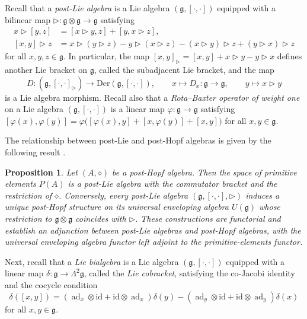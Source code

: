 \documentclass[11pt,english]{article}
\newcommand{\g}{\mathfrak{g}}
\newcommand{\id}{\mathrm{id}}
\newcommand{\act}{\mathbin{\diamond}}
\newcommand{\tri}{\mathbin{\triangleright}}
\newtheorem{proposition}[lemma]{Proposition}
\theoremstyle{definition}
\begin{document}
Recall that a \emph{post-Lie algebra} is a Lie algebra
$(\mathfrak g,[\cdot,\cdot])$ equipped with a bilinear
map $\tri:\mathfrak g\otimes\mathfrak g
\to\mathfrak g$ satisfying
\begin{align}
x\tri[y,z]
&=[x\tri y,z]+[y,x\tri z],
\label{eq:postlie-1}\\
[x,y]\tri z
&=x\tri(y\tri z)-y\tri(x\tri z)
-(x\tri y)\tri z+(y\tri x)\tri z
\label{eq:postlie-2}
\end{align}
for all $x,y,z\in\mathfrak g$.
In particular, the map $[x,y]_{\tri}=[x,y]+x\tri y-y\tri x$
defines another Lie bracket on $\mathfrak g$, called the subadjacent Lie bracket, and the map 
\begin{equation}
\label{eq:derivations}
D: (\mathfrak{g},[\cdot,\cdot]_{\tri}) \to \mathrm{Der}(\mathfrak{g},[\cdot,\cdot]), \qquad x \mapsto D_x: \g \to \g, \qquad y \mapsto x \tri y
\end{equation}
is a Lie algebra morphism.
Recall also that a \emph{Rota--Baxter operator of weight one}
on a Lie algebra $(\mathfrak g,[\cdot,\cdot])$ is a
linear map $\varphi:\mathfrak g\to\mathfrak g$ satisfying $[\varphi(x),\varphi(y)]
=\varphi\bigl(
[\varphi(x),y]+[x,\varphi(y)]+[x,y]
\bigr)$
for all $x,y\in\mathfrak g$.

The relationship between post-Lie and post-Hopf
algebras is given by the following result
\cite{LST,RSW}.

\begin{proposition}\label{prop:postlie-posthopf}
Let $(A,\act)$ be a post-Hopf algebra.
Then the space of primitive elements $P(A)$ is a post-Lie algebra with
the commutator bracket and the restriction
of $\act$.
Conversely, every post-Lie algebra
$(\mathfrak g,[\cdot,\cdot],\tri)$ induces a
unique post-Hopf structure on its universal
enveloping algebra $U(\mathfrak g)$
whose restriction to
$\mathfrak g\otimes\mathfrak g$
coincides with $\tri$. These constructions are functorial and
establish an adjunction between post-Lie
algebras and post-Hopf algebras, with the
universal enveloping algebra functor left
adjoint to the primitive-elements functor.
\end{proposition}

Next, recall that a \emph{Lie bialgebra} is a Lie algebra
$(\mathfrak g,[\cdot,\cdot])$ equipped with a linear map
$\delta:\mathfrak g\to\Lambda^2\mathfrak g$, called the
\emph{Lie cobracket}, satisfying the co-Jacobi identity
and the cocycle condition
\begin{equation}\label{eq:lie-bialgebra}
\delta([x,y])
=(\operatorname{ad}_{x}\otimes\id
+\id\otimes\operatorname{ad}_{x})
\delta(y)
-(\operatorname{ad}_y\otimes\id
+\id\otimes\operatorname{ad}_y)
\delta(x)
\end{equation}
for all $x,y\in\mathfrak g$.
\end{document}
